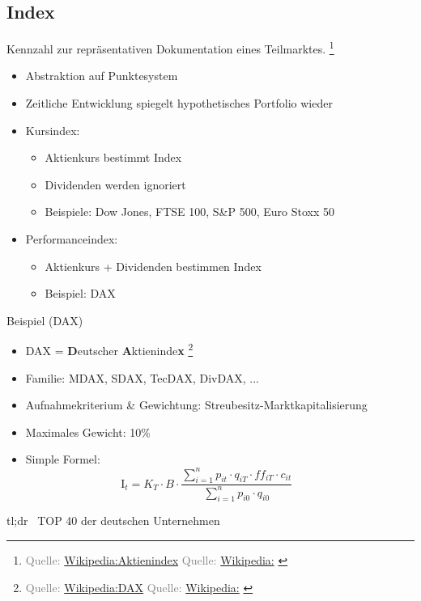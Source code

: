 \documentclass{beamer}
\let\oldfootnote\footnote
\renewcommand{\footnote}[1]
{%
	\oldfootnote
	{
		\tiny
		\textcolor{gray}{#1}
	}%
}
\newcommand{\citewiki}[2][]
{%
	\footnote
	{
		\ifthenelse{\isempty{#1}}
		{
			Quelle: \href{https://de.wikipedia.org/wiki/#2}{Wikipedia:#2}
		}
		{
			Quelle: \href{https://de.wikipedia.org/wiki/#2}{Wikipedia:#1}
		}
	}
}
\begin{document}
		\subsection{Index}
		
			\begin{frame}
				\begin{definition}
					Kennzahl zur repräsentativen Dokumentation eines Teilmarktes.\citewiki{Aktienindex}
				\end{definition}
			
				\begin{itemize}
					\item Abstraktion auf Punktesystem
					\item Zeitliche Entwicklung spiegelt hypothetisches Portfolio wieder
					\item Kursindex:
					\begin{itemize}
						\item Aktienkurs bestimmt Index
						\item Dividenden werden ignoriert
						\item Beispiele: Dow Jones, FTSE 100, S\&P 500, Euro Stoxx 50
					\end{itemize}
					\item Performanceindex:
					\begin{itemize}
						\item Aktienkurs + Dividenden bestimmen Index
						\item Beispiel: DAX
					\end{itemize}
				\end{itemize}
			\end{frame}
		
			\begin{frame}{Beispiel (DAX)}
				\begin{itemize}
					\item DAX = \textbf{D}eutscher \textbf{A}ktieninde\textbf{x}\citewiki{DAX}
					\item Familie: MDAX, SDAX, TecDAX, DivDAX, ...
					\item Aufnahmekriterium \& Gewichtung: Streubesitz-Marktkapitalisierung
					\item Maximales Gewicht: 10\%
					\item Simple Formel:\pause
					\[
						\text{I}_t = K_T \cdot B \cdot \frac
						{
							\sum_{i=1}^{n} p_{it} \cdot q_{iT} \cdot ff_{iT} \cdot c_{it}
						}
						{
							\sum_{i=1}^{n} p_{i0} \cdot q_{i0}
						}\hspace{1cm}
					\]\pause
				\end{itemize}
				\vspace{-0.25cm}
				tl;dr \textrightarrow\ TOP 40 der deutschen Unternehmen
			\end{frame}
		
\end{document}

